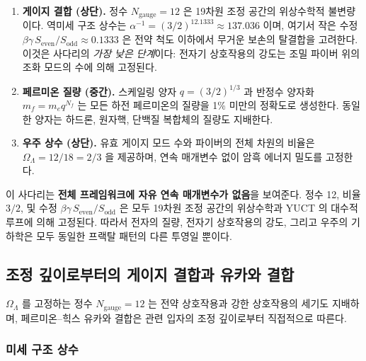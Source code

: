 \documentclass[12pt,a4paper]{article}
\begin{document}
	\begin{enumerate}[leftmargin=*]
		\item \textbf{게이지 결합 (상단).} 정수 \(N_{\mathrm{gauge}} = 12\) 은 19차원 조정 공간의 위상수학적 불변량이다. 역미세 구조 상수는 \(\alpha^{-1} = (3/2)^{12.1333} \approx 137.036\) 이며, 여기서 작은 수정 \(\beta\gamma\,S_{\mathrm{even}}/S_{\mathrm{odd}} \approx 0.1333\) 은 전약 척도 이하에서 무거운 보손의 탈결합을 고려한다. 이것은 사다리의 \emph{가장 낮은 단계}이다: 전자기 상호작용의 강도는 조밀 파이버 위의 조화 모드의 수에 의해 고정된다.
		\item \textbf{페르미온 질량 (중간).} 스케일링 양자 \(q = (3/2)^{1/3}\) 과 반정수 양자화 \(m_f = m_e q^{N_f}\) 는 모든 하전 페르미온의 질량을 1\% 미만의 정확도로 생성한다. 동일한 양자는 하드론, 원자핵, 단백질 복합체의 질량도 지배한다.
		\item \textbf{우주 상수 (상단).} 유효 게이지 모드 수와 파이버의 전체 차원의 비율은 \(\Omega_\Lambda = 12/18 = 2/3\) 을 제공하며, 연속 매개변수 없이 암흑 에너지 밀도를 고정한다.
	\end{enumerate}
	
	이 사다리는 \textbf{전체 프레임워크에 자유 연속 매개변수가 없음}을 보여준다. 정수 12, 비율 \(3/2\), 및 수정 \(\beta\gamma\,S_{\mathrm{even}}/S_{\mathrm{odd}}\) 은 모두 19차원 조정 공간의 위상수학과 YUCT 의 대수적 루프에 의해 고정된다. 따라서 전자의 질량, 전자기 상호작용의 강도, 그리고 우주의 기하학은 모두 동일한 프랙탈 패턴의 다른 투영일 뿐이다.
	
	\subsection{조정 깊이로부터의 게이지 결합과 유카와 결합}
	
	\(\Omega_\Lambda\) 를 고정하는 정수 \(N_{\mathrm{gauge}} = 12\) 는 전약 상호작용과 강한 상호작용의 세기도 지배하며, 페르미온–힉스 유카와 결합은 관련 입자의 조정 깊이로부터 직접적으로 따른다.
	
	\subsubsection{미세 구조 상수}
	
\end{document}
